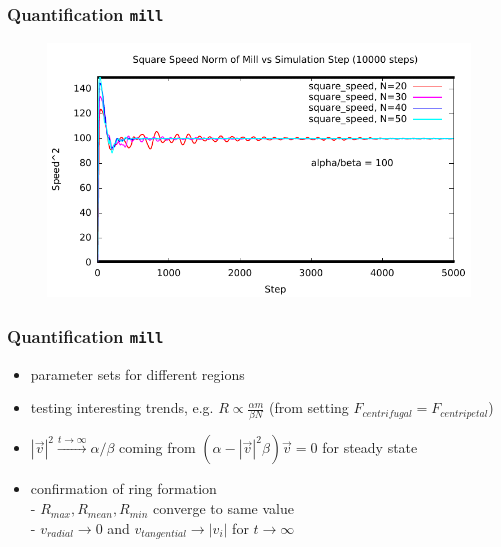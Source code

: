 \documentclass[compress]{beamer}
\begin{document}
\begin{frame}
	\frametitle{Quantification \texttt{mill}}	
	\begin{figure}[H]
		\includegraphics[width=1. \columnwidth]{../plots/mill_II_square_dt_allN.pdf}
	\end{figure}	
\end{frame}


\begin{frame}
	\frametitle{Quantification \texttt{mill}}
\begin{itemize}
	\item parameter sets for different regions
	\item testing interesting trends, e.g. \( R \propto \frac{\alpha m}{\beta N}\) (from setting \( F_{centrifugal} = F_{centripetal} \))
	\item \( |\vec{v}|^{2}  \xrightarrow{t \to \infty}  \alpha / \beta \) coming from \( (\alpha - |\vec{v}|^2 \beta ) \vec{v} = 0 \) for steady state
	\item confirmation of ring formation \\
	- \( R_{max}, R_{mean}, R_{min} \) converge to same value \\
	- \( v_{radial} \to 0 \) and \( v_{tangential} \to | v_{i} |  \) for \( t \to \infty \)
\end{itemize}
\end{frame}
\end{document}
